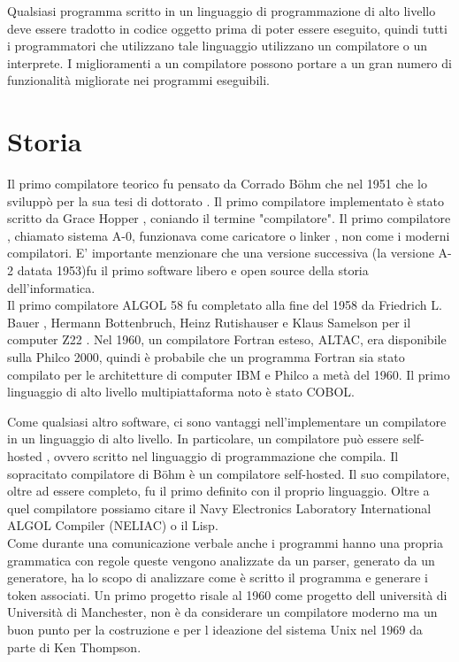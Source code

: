 \documentclass[12pt,a4paper]{report}
\begin{document}
Qualsiasi programma scritto in un linguaggio di programmazione di alto livello deve essere tradotto in codice oggetto prima di poter essere eseguito, quindi tutti i programmatori che utilizzano tale linguaggio utilizzano un compilatore o un interprete. I miglioramenti a un compilatore possono portare a un gran numero di funzionalità migliorate nei programmi eseguibili.

\section{Storia}
Il primo compilatore teorico fu pensato da Corrado Böhm che nel 1951 che lo sviluppò per la sua tesi di dottorato . Il primo compilatore implementato è stato scritto da Grace Hopper , coniando il termine "compilatore". Il primo compilatore , chiamato sistema A-0,  funzionava come caricatore o linker , non come i moderni compilatori. E' importante menzionare che una versione successiva (la versione A-2 datata 1953)fu il primo software libero e open source della storia dell'informatica. \\

Il primo compilatore ALGOL 58 fu completato alla fine del 1958 da Friedrich L. Bauer , Hermann Bottenbruch, Heinz Rutishauser e Klaus Samelson per il computer Z22 . 
Nel 1960, un compilatore Fortran esteso, ALTAC, era disponibile sulla Philco 2000, quindi è probabile che un programma Fortran sia stato compilato per le architetture di computer IBM e Philco a metà del 1960.  Il primo linguaggio di alto livello multipiattaforma noto è stato COBOL. 

Come qualsiasi altro software, ci sono vantaggi nell'implementare un compilatore in un linguaggio di alto livello. In particolare, un compilatore può essere self-hosted , ovvero scritto nel linguaggio di programmazione che compila. Il sopracitato compilatore di Böhm è un compilatore self-hosted. Il suo compilatore, oltre ad essere completo, fu il primo definito con il proprio linguaggio.
Oltre a quel compilatore possiamo citare il Navy Electronics Laboratory International ALGOL Compiler (NELIAC) o il Lisp.\\

Come durante una comunicazione verbale anche i programmi hanno una propria grammatica con regole queste vengono analizzate da un parser, generato da un generatore, ha lo scopo di analizzare come è scritto il programma e generare i token associati. Un primo progetto risale al 1960 come progetto dell università di Università di Manchester, non è da considerare un compilatore moderno ma un buon punto per la costruzione e per l ideazione del sistema Unix nel 1969 da parte di Ken Thompson.\\
\end{document}
